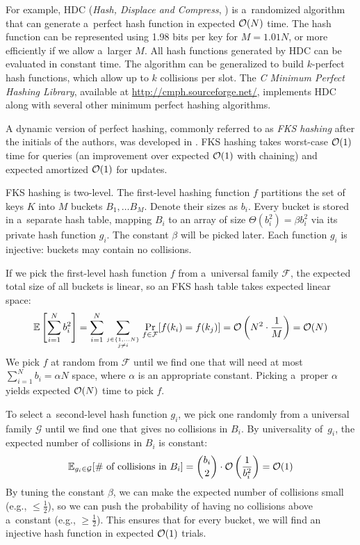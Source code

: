 For example, HDC (\textit{Hash, Displace and Compress},
\cite{hdc-hashing}) is a~randomized algorithm that can generate a~perfect
hash function in expected $\mathcal{O}(N)$ time. The hash function can be represented
using 1.98 bits per key for $M=1.01 N$, or more efficiently if we allow a~larger
$M$. All hash functions generated by HDC can be evaluated in constant time.
The algorithm can be generalized to build $k$-perfect hash functions, which
allow up to $k$ collisions per slot. The \textit{C Minimum Perfect
Hashing Library}, available at \url{http://cmph.sourceforge.net/}, implements
HDC along with several other minimum perfect hashing algorithms.

A dynamic version of perfect hashing, commonly referred to as \emph{FKS
hashing} after the initials of the authors, was developed in \cite{fks-hashing}.
FKS hashing takes worst-case $\mathcal{O}(1)$ time for queries (an improvement over
expected $\mathcal{O}(1)$ with chaining) and expected amortized $\mathcal{O}(1)$ for updates.

FKS hashing is two-level. The first-level hashing function $f$ partitions
the set of keys $K$ into $M$ buckets $B_1,\ldots B_M$. Denote their sizes as
$b_i$.
Every bucket is stored in a~separate hash table, mapping $B_i$ to an array
of size $\Theta(b_i^2)=\beta b_i^2$ via its private hash function $g_i$.
The constant $\beta$ will be picked later.
Each function $g_i$ is injective: buckets may contain no collisions.

If we pick the first-level hash function $f$ from a~universal family
$\mathcal{F}$, the expected total size of all buckets is linear, so an FKS
hash table takes expected linear space:
$$\mathbb{E}\left[\sum_{i=1}^N b_i^2\right]=
	\sum_{i=1}^N \sum_{j\in\{1,\ldots N\} \atop j\neq i}
	\Pr_{f\in\mathcal{F}}[f(k_i)=f(k_j)]=
	\mathcal{O}\left(N^2\cdot\frac{1}{M}\right)=\mathcal{O}(N)$$
We pick $f$ at random from $\mathcal{F}$ until we find one that will need at
most $\sum_{i=1}^N b_i=\alpha N$ space, where $\alpha$ is an appropriate
constant. Picking a~proper $\alpha$ yields expected $\mathcal{O}(N)$ time to pick $f$.

To select a~second-level hash function $g_i$, we pick one randomly from
a universal family $\mathcal{G}$ until we find one that gives no collisions
in $B_i$. By universality of~$g_i$, the expected number of collisions in $B_i$
is constant:
$$\mathbb{E}_{g_i\in\mathcal{G}}[\text{\# of collisions in }B_i]=
	{b_i\choose 2}\cdot\mathcal{O}\left(\frac{1}{b_i^2}\right)=\mathcal{O}(1)$$
By tuning the constant $\beta$, we can make the expected number of collisions
small (e.g., $\leq\frac{1}{2}$), so we can push the probability of having no
collisions above a~constant (e.g., $\geq\frac{1}{2}$). This ensures that for
every bucket, we will find an injective hash function in expected $\mathcal{O}(1)$
trials.

